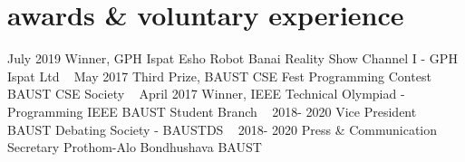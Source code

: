 \section*{awards \& voluntary experience}
\begin{entrylist}
	\myentry
	{July 2019}
	{Winner, {\normalfont GPH Ispat Esho Robot Banai Reality Show}}
	{Channel I - GPH Ispat Ltd}
	~
	\myentry
	{May 2017}
	{Third Prize, {\normalfont BAUST CSE Fest Programming Contest}}
	{BAUST CSE Society}
	~
	\myentry
	{April 2017}
	{Winner, {\normalfont IEEE Technical Olympiad - Programming}}
	{IEEE BAUST Student Branch}
	~
	\myentry
	{2018- 2020}
	{Vice President}
	{BAUST Debating Society - BAUSTDS}
	~
	\myentry
	{2018- 2020}
	{Press \& Communication Secretary}
	{Prothom-Alo Bondhushava BAUST}
	~

\end{entrylist}
